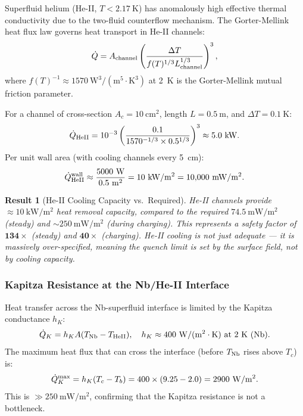 \documentclass[aps,prd,twocolumn,superscriptaddress]{revtex4-2}
\newtheorem{result}{Result}
\begin{document}
Superfluid helium (He-II, $T < 2.17~\mathrm{K}$) has anomalously high
effective thermal conductivity due to the two-fluid counterflow mechanism.
The Gorter-Mellink heat flux law governs heat transport in He-II channels:
\begin{equation}
\dot{Q} = A_{\rm channel}\left(\frac{\Delta T}{f(T)^{1/3} L_{\rm channel}^{1/3}}\right)^3,
\end{equation}
where $f(T)^{-1} \approx 1570~\mathrm{W^3/(m^5\cdot K^3)}$ at 2~K is the
Gorter-Mellink mutual friction parameter.

For a channel of cross-section $A_c = 10~\mathrm{cm^2}$, length
$L = 0.5~\mathrm{m}$, and $\Delta T = 0.1~\mathrm{K}$:
\begin{equation}
\dot{Q}_{\rm HeII} = 10^{-3}\left(\frac{0.1}{1570^{-1/3}\times 0.5^{1/3}}
\right)^3 \approx 5.0~\mathrm{kW}.
\end{equation}
Per unit wall area (with cooling channels every 5~cm):
\begin{equation}
\dot{Q}_{\rm HeII}^{\rm wall} \approx \frac{5000~\mathrm{W}}{0.5~\mathrm{m^2}}
= 10~\mathrm{kW/m^2} = 10{,}000~\mathrm{mW/m^2}.
\end{equation}

\begin{result}[He-II Cooling Capacity vs.\ Required]
He-II channels provide $\approx 10~\mathrm{kW/m^2}$ heat removal
capacity, compared to the required $74.5~\mathrm{mW/m^2}$ (steady) and
$\sim 250~\mathrm{mW/m^2}$ (during charging).  This represents a safety
factor of $\mathbf{134\times}$ (steady) and $\mathbf{40\times}$ (charging).
He-II cooling is not just adequate --- it is massively over-specified,
meaning the quench limit is set by the \emph{surface field}, not by
cooling capacity.
\end{result}

\subsubsection{Kapitza Resistance at the Nb/He-II Interface}

Heat transfer across the Nb-superfluid interface is limited by the
Kapitza conductance $h_K$:
\begin{equation}
\dot{Q}_K = h_K A (T_{\rm Nb} - T_{\rm HeII}),
\quad h_K \approx 400~\mathrm{W/(m^2\cdot K)}~\text{at 2~K (Nb)}.
\end{equation}
The maximum heat flux that can cross the interface (before $T_{\rm Nb}$
rises above $T_c$) is:
\begin{equation}
\dot{Q}_{K}^{\rm max} = h_K (T_c - T_b)
= 400\times (9.25 - 2.0) = 2900~\mathrm{W/m^2}.
\end{equation}
This is $\gg 250~\mathrm{mW/m^2}$, confirming that the Kapitza
resistance is not a bottleneck.
\end{document}
